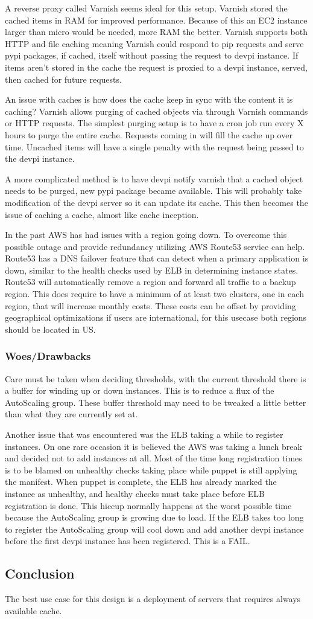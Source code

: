 \documentclass[12pt, letterpaper]{article}
\begin{document}
A reverse proxy called Varnish seems ideal for this setup. Varnish stored the cached items in RAM for improved performance. Because
of this an EC2 instance larger than micro would be needed, more RAM the better. Varnish supports both HTTP and file caching meaning
Varnish could respond to pip requests and serve pypi packages, if cached, itself without passing the request to devpi instance. If items
aren't stored in the cache the request is proxied to a devpi instance, served, then cached for future requests. 

An issue with caches is how does the cache keep in sync with the content it is caching? Varnish allows purging of cached objects via through
Varnish commands or HTTP requests. The simplest purging setup is to have a cron job run every X hours to purge the entire cache. Requests coming 
in will fill the cache up over time. Uncached items will have a single penalty with the request being passed to the devpi instance.

A more complicated method is to have devpi notify varnish that a cached object needs to be purged, new pypi package became available. This
will probably take modification of the devpi server so it can update its cache. This then becomes the issue of caching a cache, almost like cache 
inception.

In the past AWS has had issues with a region going down. To overcome this possible outage and provide redundancy utilizing AWS Route53
service can help. Route53 has a DNS failover feature that can detect when a primary application is down, similar to the health checks used
by ELB in determining instance states. Route53 will automatically remove a region and forward all traffic to a backup region. This does
require to have a minimum of  at least two clusters, one in each region, that will increase monthly costs. These costs can be offset by 
providing geographical optimizations if users are international, for this usecase both regions should be located in US.

\subsubsection{Woes/Drawbacks}
Care must be taken when deciding thresholds, with the current threshold there is a buffer for winding up or down instances. This
is to reduce a flux of the AutoScaling group. These buffer threshold may need to be tweaked a little better than what they are
currently set at.

Another issue that was encountered was the ELB taking a while to register instances. On one rare occasion it is believed the AWS
was taking a lunch break and decided not to add instances at all. Most of the time long registration times is to be blamed
on unhealthy checks taking place while puppet is still applying the manifest. When puppet is complete, the ELB has already marked
the instance as unhealthy, and healthy checks must take place before ELB registration is done. This hiccup normally happens at 
the worst possible time because the AutoScaling group is growing due to load. If the ELB takes too long to register the
AutoScaling group will cool down and add another devpi instance before the first devpi instance has been registered. This is a FAIL.

\subsection{Conclusion}
The best use case for this design is a deployment of servers that requires always available cache.
\end{document}
